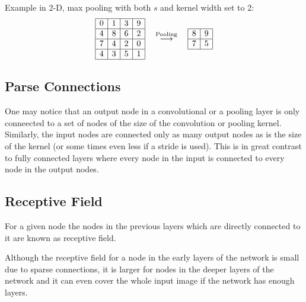 \documentclass[]{article}
\begin{document}
Example in 2-D, max pooling with both $s$ and kernel width set to 2:
\[
\begin{array}{|c|c|c|c|}
  \hline
  0 & 1 & 3 & 9\\
  \hline
  4 & 8 & 6 & 2\\
  \hline
  7 & 4 & 2 & 0\\
  \hline
  4 & 3 & 5 & 1\\
  \hline
 \end{array}
 \quad \stackrel{\text{Pooling}}{\longrightarrow} \quad
 \begin{array}{|c|c|}
   \hline
   8 & 9\\
   \hline
   7 & 5\\
   \hline
  \end{array}
 \]

\subsection{Parse Connections}
One may notice that an output node in a convolutional or a pooling layer is only
conneected to a set of nodes of the size of the convolution or pooling kernel.
Similarly, the input nodes are connected only as many output nodes as is the size
of the kernel (or some times even less if a stride is used). This is in great contrast
to fully connected layers where every node in the input is connected to every node
in the output nodes.


\subsection{Receptive Field}
For a given node the nodes in the previous layers which are directly connected
to it are known as receptive field.

Although the receptive field for a node in the early layers of the network is small
due to sparse connections, it is larger for nodes in the deeper layers of the network
and it can even cover the whole input image if the network has enough layers.
\end{document}
